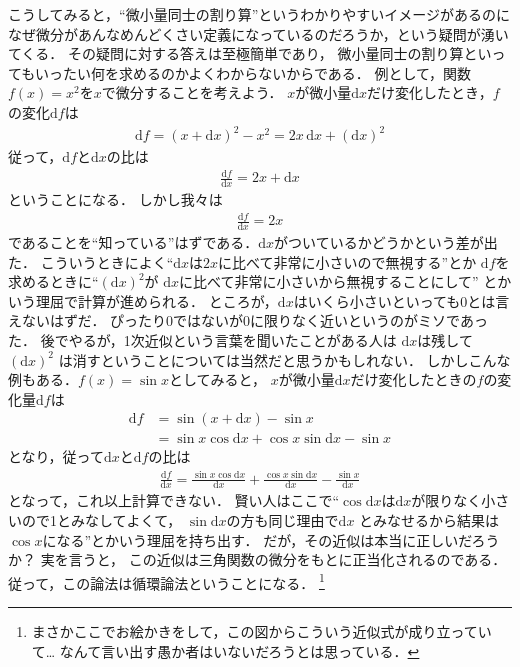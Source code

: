 こうしてみると，``微小量同士の割り算''というわかりやすいイメージがあるのに
なぜ微分があんなめんどくさい定義になっているのだろうか，という疑問が湧いてくる．
その疑問に対する答えは至極簡単であり，
微小量同士の割り算といってもいったい何を求めるのかよくわからないからである．
例として，関数$f(x)=x^2$を$x$で微分することを考えよう．
$x$が微小量$\mathrm{d} x$だけ変化したとき，$f$の変化$\mathrm{d} f$は
\begin{align*}
\mathrm{d} f = ( x + \mathrm{d} x ) ^2 - x^2 = 2x \, \mathrm{d} x + ( \mathrm{d} x ) ^2
\end{align*}
従って，$\mathrm{d} f$と$\mathrm{d} x$の比は
\begin{align*}
\frac{ \mathrm{d} f } { \mathrm{d} x } = 2x + \mathrm{d} x
\end{align*}
ということになる．
しかし我々は
\begin{align*}
\frac{ \mathrm{d} f } { \mathrm{d} x } = 2x
\end{align*}
であることを``知っている''はずである．$\mathrm{d} x$がついているかどうかという差が出た．
こういうときによく``$ \mathrm{d} x $は$2x$に比べて非常に小さいので無視する''とか
$\mathrm{d} f$を求めるときに``$( \mathrm{d} x ) ^2$が
$\mathrm{d} x $に比べて非常に小さいから無視することにして''
とかいう理屈で計算が進められる．
ところが，$\mathrm{d} x$はいくら小さいといっても0とは言えないはずだ．
ぴったり0ではないが0に限りなく近いというのがミソであった．
後でやるが，1次近似という言葉を聞いたことがある人は
$\mathrm{d} x$は残して$( \mathrm{d} x )^2$
は消すということについては当然だと思うかもしれない． 
しかしこんな例もある．$f(x) = \sin x$としてみると，
$x$が微小量$\mathrm{d}x$だけ変化したときの$f$の変化量$\mathrm{d}f$は
\begin{align*}
\mathrm{d} f & = \sin (x + \mathrm{d} x ) - \sin x \\
 & = \sin x \cos \mathrm{d} x + \cos x \sin \mathrm{d} x - \sin x
\end{align*}
 となり，従って$\mathrm{d} x$と$\mathrm{d} f$の比は
\begin{align*}
 \frac{ \mathrm{d} f } { \mathrm{d} x } = \frac{ \sin x \cos \mathrm{d} x }{\mathrm{d} x} 
 + \frac { \cos x \sin \mathrm{d} x } { \mathrm{d}x } - \frac { \sin x } { \mathrm{d} x }
\end{align*}
となって，これ以上計算できない． 
賢い人はここで``$\cos \mathrm{d} x$は$\mathrm{d} x$が限りなく小さいので1とみなしてよくて，
$\sin \mathrm{d} x$の方も同じ理由で$\mathrm{d} x$
とみなせるから結果は$\cos x$になる''とかいう理屈を持ち出す．
だが，その近似は本当に正しいだろうか？ 実を言うと，
この近似は三角関数の微分をもとに正当化されるのである．
従って，この論法は循環論法ということになる．
\footnote{まさかここでお絵かきをして，この図からこういう近似式が成り立っていて…
なんて言い出す愚か者はいないだろうとは思っている．}

